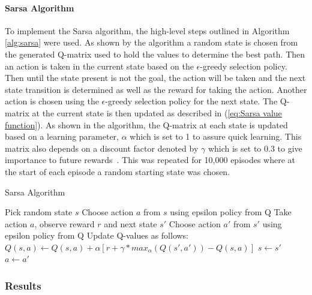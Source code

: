 \documentclass[12pt,american]{report}
\begin{document}
\paragraph{Sarsa Algorithm}
To implement the Sarsa algorithm, the high-level steps outlined in Algorithm \ref{alg:sarsa} were used.  As shown by the algorithm a random state is chosen from the generated Q-matrix used to hold the values to determine the best path.  Then an action is taken in the current state based on the \begin{math}\epsilon\end{math}-greedy selection policy.  Then until the state present is not the goal, the action will be taken and the next state transition is determined as well as the reward for taking the action. Another action is chosen using the \begin{math}\epsilon\end{math}-greedy selection policy for the next state. The Q-matrix at the current state is then updated as described in (\ref{eq:Sarsa value function}). As shown in the algorithm, the Q-matrix at each state is updated based on a learning parameter, \begin{math}\alpha\end{math} which is set to 1 to assure quick learning. This matrix also depends on a discount factor denoted by \begin{math}\gamma\end{math} which is set to 0.3 to give importance to future rewards~\cite{Eden}. This was repeated for 10,000 episodes where at the start of each episode a random starting state was chosen.



\begin{algorithm}
\caption{Sarsa Algorithm~\cite{Eden}}
\label{alg:sarsa}
\begin{algorithmic} 
\State Pick random state $s$
\State Choose action $a$ from $s$ using epsilon policy from Q
\State Take action $a$, observe reward $r$ and next state $s'$
\State Choose action $a'$ from $s'$ using epsilon policy from Q
\State Update Q-values as follows:
\State $Q(s,a) \leftarrow Q(s,a) + \alpha [r+ \gamma*max_{\alpha}(Q(s',a')) - Q(s,a)] $
\State $s \leftarrow s'$
\State $a \leftarrow a'$
\EndWhile
\EndFor
\end{algorithmic}
\end{algorithm}


\subsubsection{Results}
\end{document}
